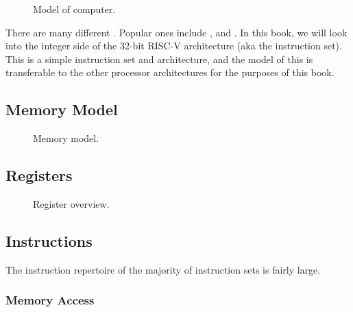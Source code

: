 \begin{figure}[tbp]
  
  \caption{Model of computer.}
  \label{fig:machine:computer}
\end{figure}

There are many different . Popular ones include ,  and . In this book, we will look into the integer side of the 32-bit RISC-V architecture (aka the  instruction set). This is a simple instruction set and architecture, and the model of this is transferable to the other processor architectures for the purposes of this book.

\subsection{Memory Model}

\begin{figure}[tbp]
  
  \caption{Memory model.}
  \label{fig:machine:memory}
\end{figure}

\subsection{Registers}


\begin{figure}[tbp]
  
  \caption{Register overview.}
  \label{fig:machine:regs}
\end{figure}


\subsection{Instructions}

The instruction repertoire of the majority of instruction sets is fairly large.


\subsubsection{Memory Access}

